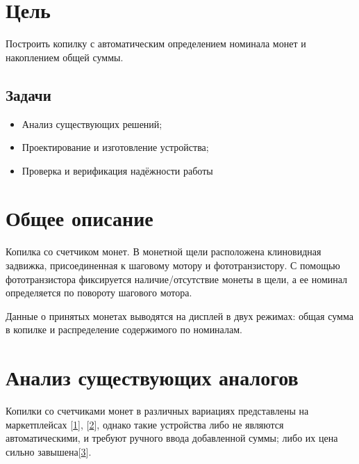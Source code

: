 \section {Цель}
Построить копилку с автоматическим определением номинала монет и накоплением общей суммы.

\subsection*{Задачи}
\begin{itemize}
	\item Анализ существующих решений;
	\item Проектирование и изготовление устройства;
	\item Проверка и верификация надёжности работы
\end{itemize}

\section {Общее описание}

Копилка со счетчиком монет. В монетной щели расположена клиновидная задвижка, присоединенная к шаговому мотору и фототранзистору. С помощью фототранзистора фиксируется наличие/отсутствие монеты в щели, а ее номинал определяется по повороту шагового мотора.
\par\medskip

Данные о принятых монетах выводятся на дисплей в двух режимах: общая сумма в копилке и распределение содержимого по номиналам.

\section {Анализ существующих аналогов}

Копилки со счетчиками монет в различных вариациях представлены на маркетплейсах [\href{https://www.ozon.ru/product/yilijukj-kopilka-dlya-deneg-11h20-sm-1358489566/?asb=sCr1GmIlWB7Fjby%252BPYnWUNFeAjvdIw5ordlD0iRvbOM%253D&asb2=sn4m9gpYWZy_EEZH7OfMzDGoCOjFWmDehfvE83sshNuqVbbHLKnkaqdBme_UnwQL9zPGT5WB-Cli3HsA9FpOcg&avtc=1&avte=2&avts=1717862839&keywords=копилка+счетчик}{1}], [\href{https://aliexpress.ru/item/1005002928697666.html?sku_id=12000028995331515&spm=a2g2w.productlist.search_results.1.5d644f98Nvin2D}{2}], однако такие устройства либо не являются автоматическими, и требуют ручного ввода добавленной суммы; либо их цена сильно завышена[\href{https://www.ozon.ru/product/schetchik-i-sortirovshchik-monet-cassida-coinmax-1324388430/?asb=FCEZ8bYDzfLDlR1hbPXsPN7zg5D8DCyINZKx%252ByUJkgQ%253D&asb2=pFy0DP03AN1Um2JNqhlwAfVK8Tqf4HIHittgnkgxfxYFRn3HUd_mHS4O0_9rIrPfWd8S0KDwvHJyzVXS0PcbQw&avtc=1&avte=2&avts=1718018978&keywords=cassida+%D0%BC%D0%BE%D0%BD%D0%B5%D1%82%D1%8B}{3}].
\par\medskip

